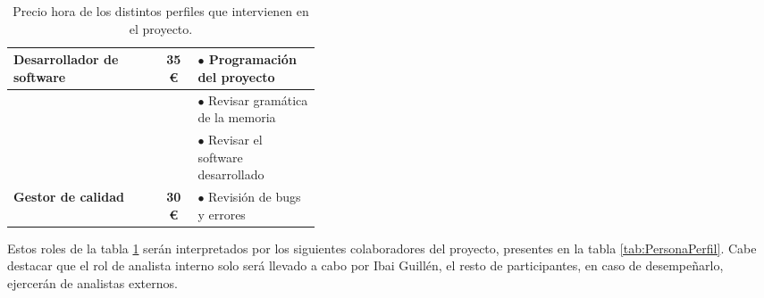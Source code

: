 \begin{table}[H]
\begin{center}
\begin{tabular}{|l|c|p{0.4\linewidth}|}
                
            \rowcolor{GrisTabla}
            \textbf{Desarrollador de software} & \textbf{35 \euro} & $\bullet$  Programación del proyecto\\
            \hline

            & & $\bullet$ Revisar gramática de la memoria\\
            & & $\bullet$ Revisar el software desarrollado\\
            \multirow{-3}{*}{\textbf{Gestor de calidad}} & \multirow{-3}{*}{\textbf{30 \euro}} & $\bullet$ Revisión de bugs y errores\\
            \hline

        \end{tabular}
        \caption{\centering Precio hora de los distintos perfiles que intervienen en el proyecto.}
        \label{tab:PrecioPerfil}
    \end{center}    
\end{table}
\pagebreak
Estos roles de la tabla \ref{tab:PrecioPerfil} serán interpretados por los siguientes colaboradores del proyecto, presentes en la tabla \ref{tab:PersonaPerfil}. Cabe destacar que el rol de analista interno solo será llevado a cabo por Ibai Guillén, el resto de participantes, en caso de desempeñarlo, ejercerán de analistas externos.
